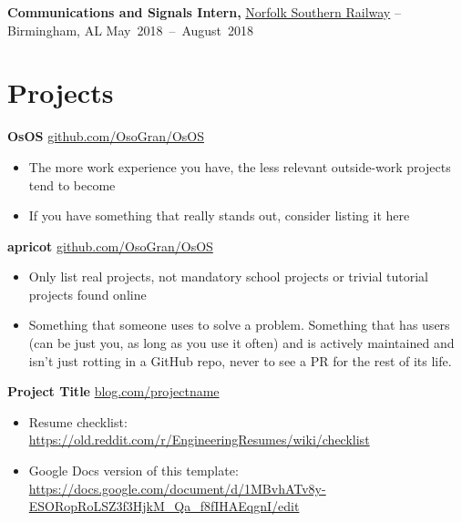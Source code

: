 \documentclass[11pt]{article}       %
\begin{document}
\textbf{Communications and Signals Intern,} \href{https://www.norfolksouthern.com/}{Norfolk Southern Railway} -- Birmingham, AL \mbox{\hfill May 2018 -- August 2018} \\

\vspace{-9pt}

\section*{Projects}
\textbf{OsOS} \hfill \href{https://github.com/OsoGran/OsOS}{github.com/OsoGran/OsOS} \\
\vspace{-9pt}
\begin{itemize}
  \item The more work experience you have, the less relevant outside-work projects tend to become
  \item If you have something that really stands out, consider listing it here
\end{itemize}

\textbf{apricot} \hfill \href{https://github.com/OsoGran/OsOS}{github.com/OsoGran/OsOS} \\
\vspace{-9pt}
\begin{itemize}
  \item Only list real projects, not mandatory school projects or trivial tutorial projects found online 
  \item Something that someone uses to solve a problem. Something that has users (can be just you, as long as you use it often) and is actively maintained and isn't just rotting in a GitHub repo, never to see a PR for the rest of its life. 
\end{itemize}

\textbf{Project Title} \hfill \href{https://www.hardwareishard.net/portfolio-database}{blog.com/projectname} \\
\vspace{-9pt}
\begin{itemize}
  \item Resume checklist: \url{https://old.reddit.com/r/EngineeringResumes/wiki/checklist}
  \item Google Docs version of this template: \url{https://docs.google.com/document/d/1MBvhATv8y-ESORopRoLSZ3f3HjkM_Qa_f8fIHAEqgnI/edit}
\end{itemize}
\end{document}

